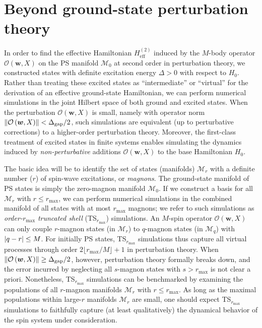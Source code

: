 \documentclass[nofootinbib,notitlepage,11pt]{revtex4-2}
\renewcommand{\t}{\text} %
\newcommand{\p}[1]{\left(#1\right)} %
\newcommand{\m}{\bm} %
\newcommand{\1}{\mathds{1}}
\newcommand{\M}{\mathcal{M}}
\renewcommand{\O}{\mathcal{O}}
\newcommand{\floor}[1]{\lfloor{#1}\rfloor}
\begin{document}
\section{Beyond ground-state perturbation theory}
\label{sec:shell_model}

In order to find the effective Hamiltonian $H_{\t{eff}}^{(2)}$ induced
by the $M$-body operator $\O\p{\m w,X}$ on the PS manifold $\M_0$ at
second order in perturbation theory, we constructed states with
definite excitation energy $\Delta>0$ with respect to $H_0$.  Rather
than treating these excited states as ``intermediate'' or ``virtual''
for the derivation of an effective ground-state Hamiltonian, we can
perform numerical simulations in the joint Hilbert space of both
ground and excited states.  When the perturbation $\O\p{\m w,X}$ is
small, namely with operator norm
$\norm{\O\p{\m w,X}}<\Delta_{\t{gap}}/2$, such simulations are
equivalent (up to perturbative corrections) to a higher-order
perturbation theory.  Moreover, the first-class treatment of excited
states in finite systems enables simulating the dynamics induced by
{\it non-perturbative} additions $\O\p{\m w,X}$ to the base
Hamiltonian $H_0$.

The basic idea will be to identify the set of states (manifolds)
$\M_r$ with a definite number ($r$) of spin-wave excitations, or {\it
  magnons}.  The ground-state manifold of PS states is simply the
zero-magnon manifold $\M_0$.  If we construct a basis for all $\M_r$
with $r\le r_{\t{max}}$, we can perform numerical simulations in the
combined manifold of all states with at most $r_{\t{max}}$ magnons; we
refer to such simulations as {\it order-}$r_{\t{max}}$ {\it truncated
  shell} (TS$_{r_{\t{max}}}$) simulations.  An $M$-spin operator
$\O\p{\m w,X}$ can only couple $r$-magnon states (in $\M_r$) to
$q$-magnon states (in $\M_q$) with $\abs{q-r}\le M$.  For initially PS
states, TS$_{r_{\t{max}}}$ simulations thus capture all virtual
processes through order $2\floor{r_{\t{max}}/M}+1$ in perturbation
theory.  When $\norm{\O\p{\m w,X}}\ge\Delta_{\t{gap}}/2$, however,
perturbation theory formally breaks down, and the error incurred by
neglecting all $s$-magnon states with $s>r_{\t{max}}$ is not clear a
priori.  Nonetheless, TS$_{r_{\t{max}}}$ simulations can be
benchmarked by examining the populations of all $r$-magnon manifolds
$\M_r$ with $r\le r_{\t{max}}$.  As long as the maximal populations
within large-$r$ manifolds $\M_r$ are small, one should expect
TS$_{r_{\t{max}}}$ simulations to faithfully capture (at least
qualitatively) the dynamical behavior of the spin system under
consideration.
\end{document}
